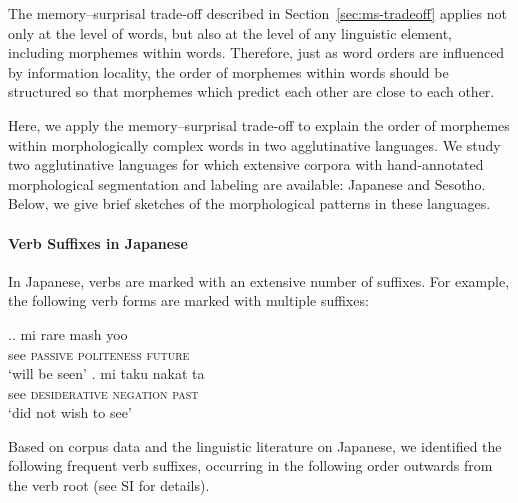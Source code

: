 
The memory--surprisal trade-off described in Section~\ref{sec:ms-tradeoff} applies not only at the level of words, but also at the level of any linguistic element, including morphemes within words. Therefore, just as word orders are influenced by information locality, the order of morphemes within words should be structured so that morphemes which predict each other are close to each other.

Here, we apply the memory--surprisal trade-off to explain the order of morphemes within morphologically complex words in two agglutinative languages. We study two agglutinative languages for which extensive corpora with hand-annotated morphological segmentation and labeling are available: Japanese and Sesotho. Below, we give brief sketches of the morphological patterns in these languages.


\paragraph{Verb Suffixes in Japanese}

In Japanese, verbs are marked with an extensive number of suffixes. For example, the following verb forms are marked with multiple suffixes:

\ex.\ag. mi  rare mash yoo \\
see  \textsc{passive}  \textsc{politeness}  \textsc{future} \\
`will be seen'
\bg. mi taku nakat ta \\
see \textsc{desiderative} \textsc{negation} \textsc{past} \\
`did not wish to see'

Based on corpus data and the linguistic literature on Japanese, we identified the following frequent verb suffixes, occurring in the following order outwards from the verb root (see SI for details).


